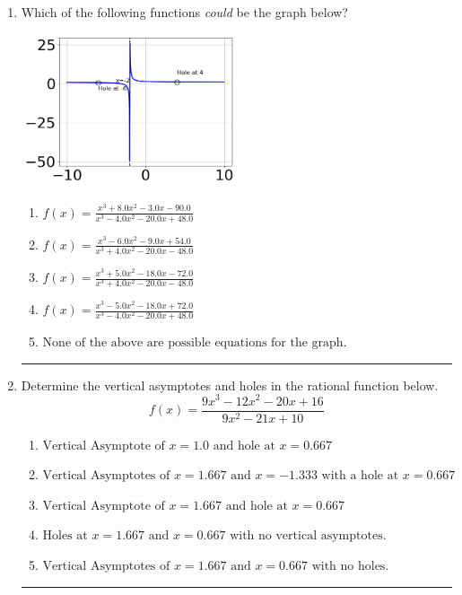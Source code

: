 \documentclass[14pt]{extbook}
\newcommand{\litem}[1]{\item#1\hspace*{-1cm}\rule{\textwidth}{0.4pt}}
\begin{document}
\begin{enumerate}
{\begin{enumerate}[label=\Alph*.]
\end{enumerate} }
\litem{
Which of the following functions \textit{could} be the graph below?
\begin{center}
    \includegraphics[width=0.5\textwidth]{../Figures/identifyGraphOfRationalFunctionCopyB.png}
\end{center}
\begin{enumerate}[label=\Alph*.]
\item \( f(x)=\frac{x^{3} +8.0 x^{2} -3.0 x -90.0}{x^{3} -4.0 x^{2} -20.0 x + 48.0} \)
\item \( f(x)=\frac{x^{3} -6.0 x^{2} -9.0 x + 54.0}{x^{3} +4.0 x^{2} -20.0 x -48.0} \)
\item \( f(x)=\frac{x^{3} +5.0 x^{2} -18.0 x -72.0}{x^{3} +4.0 x^{2} -20.0 x -48.0} \)
\item \( f(x)=\frac{x^{3} -5.0 x^{2} -18.0 x + 72.0}{x^{3} -4.0 x^{2} -20.0 x + 48.0} \)
\item \( \text{None of the above are possible equations for the graph.} \)

\end{enumerate} }
\litem{
Determine the vertical asymptotes and holes in the rational function below.\[ f(x) = \frac{9x^{3} -12 x^{2} -20 x + 16}{9x^{2} -21 x + 10} \]\begin{enumerate}[label=\Alph*.]
\item \( \text{Vertical Asymptote of } x = 1.0 \text{ and hole at } x = 0.667 \)
\item \( \text{Vertical Asymptotes of } x = 1.667 \text{ and } x = -1.333 \text{ with a hole at } x = 0.667 \)
\item \( \text{Vertical Asymptote of } x = 1.667 \text{ and hole at } x = 0.667 \)
\item \( \text{Holes at } x = 1.667 \text{ and } x = 0.667 \text{ with no vertical asymptotes.} \)
\item \( \text{Vertical Asymptotes of } x = 1.667 \text{ and } x = 0.667 \text{ with no holes.} \)


\end{enumerate}}
\end{enumerate}
\end{document}
